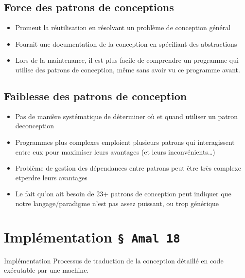 \documentclass[16pt]{report}
\begin{document}
\begin{multicols*}{2}
    \section{Force des patrons de conceptions}

    \begin{itemize}
        \item Promeut la réutilisation en résolvant un problème de conception général
        \item Fournit une documentation de la conception en spécifiant des abstractions
        \item Lors de la maintenance, il est plus facile de comprendre un programme 
            qui utilise des patrons de conception, même sans avoir vu ce programme avant. 
    \end{itemize}

    \section{Faiblesse des patrons de conception}

    \begin{itemize}
        \item Pas de manière systématique de déterminer où et quand utiliser
            un patron deconception
        \item Programmes plus complexes emploient plusieurs patrons qui interagissent 
            entre eux pour maximiser leurs avantages (et leurs inconvénients…)
        \item Problème de gestion des dépendances entre patrons peut être 
            très complexe etperdre leurs avantages
        \item Le fait qu’on ait besoin de 23+ patrons de conception peut indiquer que notre 
            langage/paradigme n’est pas assez puissant, ou trop générique


    \end{itemize}
        

    \chapter{Implémentation \texttt{\S \; Amal 18}   }

    \begin{Definitionx}{Implémentation}{}
        Processus de traduction de la conception détaillé en code exécutable par une machine. 
    \end{Definitionx}
    \pagebreak



\end{multicols*}
\end{document}
